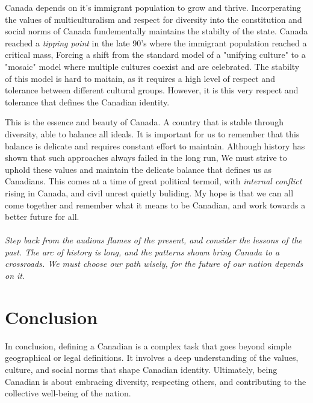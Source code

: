 \documentclass{article}
\begin{document}
Canada depends on it's immigrant population to grow and thrive.
Incorperating the values of multiculturalism and respect for diversity into the constitution and social norms of Canada
fundementally maintains the stabilty of the state.
Canada reached a \textit{tipping point} in the late 90's where the immigrant population reached a critical mass,
Forcing a shift from the standard model of a "unifying culture" to a "mosaic" model where multiple cultures coexist and are celebrated.
The stabilty of this model is hard to maitain, as it requires a high level of respect and tolerance between different cultural groups.
However, it is this very respect and tolerance that defines the Canadian identity.

This is the essence and beauty of Canada. A country that is stable through diversity, able to balance all ideals.
It is important for us to remember that this balance is delicate and requires constant effort to maintain. 
Although history has shown that such approaches always failed in the long run, We must strive to uphold these values and maintain the delicate balance that defines us as Canadians.
This comes at a time of great political termoil, with \textit{internal conflict} rising in Canada, and civil unrest quietly buliding.
My hope is that we can all come together and remember what it means to be Canadian, and work towards a better future for all.\\\\

\textit{Step back from the audious flames of the present, and consider the lessons of the past. The arc of history is long, and the patterns shown bring Canada to a crossroads. We must choose our path wisely, for the future of our nation depends on it.}
\section{Conclusion}
In conclusion, defining a Canadian is a complex task that goes beyond simple geographical or legal definitions.
It involves a deep understanding of the values, culture, and social norms that shape Canadian identity.
Ultimately, being Canadian is about embracing diversity, respecting others, and contributing to the collective well-being of the nation.
\end{document}
